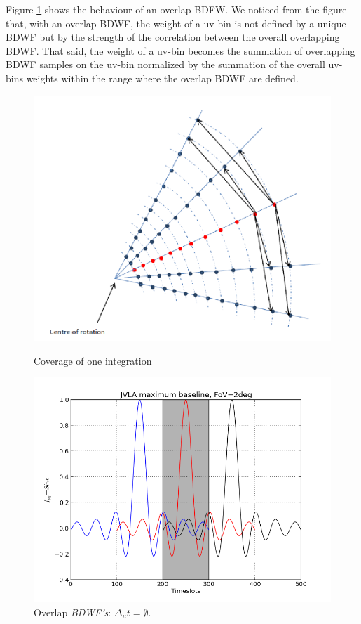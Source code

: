 \documentclass[useAMS,usenatbib]{mn2e}
\begin{document}
Figure \ref{fig:corrSigVLAMxBl_overlapGdelta} shows the behaviour of an overlap BDFW. We noticed from the figure that, with an overlap 
BDWF, 
the weight of a uv-bin is not defined by a unique BDWF but by the strength of the correlation between the overall  overlapping BDWF. 
That said, the weight of a uv-bin becomes the summation of overlapping BDWF samples on the uv-bin normalized by the summation of the 
overall uv-bins weights within the range where the overlap BDWF are defined.
\begin{figure}
\begin{minipage}{0.38\linewidth}\includegraphics[width=1\textwidth]{./Figures/uvcov.png}\caption{Coverage of 
one integration}\label{fig:uvcov}\end{minipage}
  \hspace{1cm} 
\begin{minipage}{0.38\linewidth}\includegraphics[width=1\textwidth]{./Figures/corrSigVLAMxBl_overlapGdelta.png}\caption{Overlap 
		\textit{BDWF's}: $\Delta_u t=\emptyset$.}\label{fig:corrSigVLAMxBl_overlapGdelta}\end{minipage}
\end{figure}
\end{document}
